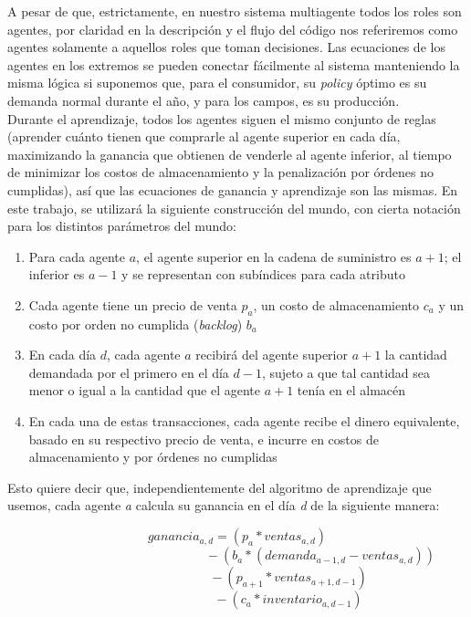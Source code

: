 A pesar de que, estrictamente, en nuestro sistema multiagente todos los roles son agentes, por claridad en la descripci\'on y el flujo del c\'odigo nos referiremos como agentes solamente a aquellos roles que toman decisiones. Las ecuaciones de los agentes en los extremos se pueden conectar f\'acilmente al sistema manteniendo la misma l\'ogica si suponemos que, para el consumidor, su \textit{policy} \'optimo es su demanda normal durante el a\~no, y para los campos, es su producci\'on.\\

Durante el aprendizaje, todos los agentes siguen el mismo conjunto de reglas (aprender cu\'anto tienen que comprarle al agente superior en cada d\'ia, maximizando la ganancia que obtienen de venderle al agente inferior, al tiempo de minimizar los costos de almacenamiento y la penalizaci\'on por \'ordenes no cumplidas), as\'i que las ecuaciones de ganancia y aprendizaje son las mismas. En este trabajo, se utilizar\'a la siguiente construcci\'on del mundo, con cierta notaci\'on para los distintos par\'ametros del mundo:

\begin{enumerate}
    \item Para cada agente \textit{$a$}, el agente superior en la cadena de suministro es \textit{$a+1$}; el inferior es \textit{$a-1$} y se representan con sub\'indices para cada atributo
    \item Cada agente tiene un precio de venta \textit{$p_{a}$}, un costo de almacenamiento \textit{$c_{a}$} y un costo por orden no cumplida (\textit{backlog}) \textit{$b_{a}$}
    \item En cada d\'ia \textit{$d$}, cada agente \textit{$a$} recibir\'a del agente superior \textit{$a+1$} la cantidad demandada por el primero en el d\'ia \textit{$d-1$}, sujeto a que tal cantidad sea menor o igual a la cantidad que el agente \textit{$a+1$} ten\'ia en el almac\'en
    \item En cada una de estas transacciones, cada agente recibe el dinero equivalente, basado en su respectivo precio de venta, e incurre en costos de almacenamiento y por \'ordenes no cumplidas
\end{enumerate}


Esto quiere decir que, independientemente del algoritmo de aprendizaje que usemos, cada agente \textit{a} calcula su ganancia en el d\'ia \textit{d} de la siguiente manera:

$$
ganancia_{a,d} = (p_{a} * ventas_{a, d}) 
$$
$$
\quad  \quad  \quad  \quad  \quad  \quad  \quad  \quad  \quad \quad  \quad   \quad  \quad - (b_{a}* (demanda_{a-1,d} - ventas_{a,d})) 
$$
$$
\quad  \quad  \quad  \quad  \quad  \quad  \quad  \quad - (p_{a+1}*ventas_{a+1, d-1})
$$
$$
\quad  \quad  \quad  \quad  \quad  \quad  \quad  \quad - (c_{a}*inventario_{a,d-1})
$$

